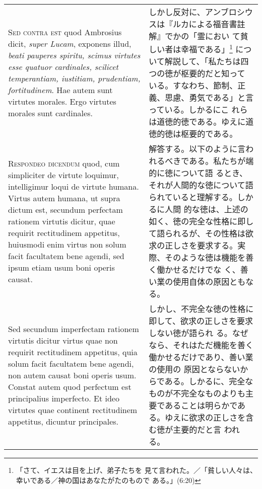 \documentclass[10pt]{jsarticle}
\begin{document}
\begin{longtable}{p{21em}p{21em}}
{\scshape Sed contra est} quod Ambrosius dicit, {\itshape super
Lucam}, exponens illud, {\itshape beati pauperes spiritu, scimus
virtutes esse quatuor cardinales, scilicet temperantiam, iustitiam,
prudentiam, fortitudinem}. Hae autem sunt virtutes morales. Ergo
virtutes morales sunt cardinales.

&

しかし反対に、アンブロシウスは『ルカによる福音書註解』でかの「霊におい
て貧しい者は幸福である」\footnote{「さて、イエスは目を上げ、弟子たちを
見て言われた。／「貧しい人々は、幸いである／神の国はあなたがたのもので
ある。」(6:20)} について解説して、「私たちは四つの徳が枢要的だと知って
いる。すなわち、節制、正義、思慮、勇気である」と言っている。しかるにこ
れらは道徳的徳である。ゆえに道徳的徳は枢要的である。
 
\\



 {\scshape Respondeo dicendum} quod, cum simpliciter de virtute
 loquimur, intelligimur loqui de virtute humana. Virtus autem humana,
 ut supra dictum est, secundum perfectam rationem virtutis dicitur,
 quae requirit rectitudinem appetitus, huiusmodi enim virtus non solum
 facit facultatem bene agendi, sed ipsum etiam usum boni operis
 causat.

&

 解答する。以下のように言われるべきである。私たちが端的に徳について語
 るとき、それが人間的な徳について語られていると理解する。しかるに人間
 的な徳は、上述の如く、徳の完全な性格に即して語られるが、その性格は欲
 求の正しさを要求する。実際、そのような徳は機能を善く働かせるだけでな
 く、善い業の使用自体の原因ともなる。

 
\\


 Sed secundum imperfectam rationem virtutis dicitur virtus quae non
 requirit rectitudinem appetitus, quia solum facit facultatem bene
 agendi, non autem causat boni operis usum. Constat autem quod
 perfectum est principalius imperfecto. Et ideo virtutes quae
 continent rectitudinem appetitus, dicuntur principales.


 

&

 しかし、不完全な徳の性格に即して、欲求の正しさを要求しない徳が語られ
 る。なぜなら、それはただ機能を善く働かせるだけであり、善い業の使用の
 原因とならないからである。しかるに、完全なものが不完全なものよりも主
 要であることは明らかである。ゆえに欲求の正しさを含む徳が主要的だと言
 われる。


\end{longtable}
\end{document}
